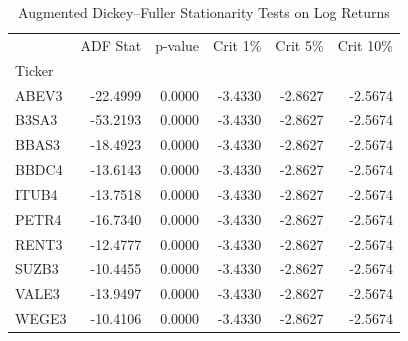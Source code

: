 \begin{table}
\caption{Augmented Dickey--Fuller Stationarity Tests on Log Returns}
\label{tab:stationarity}
\begin{tabular}{lrrrrr}
\toprule
 & ADF Stat & p-value & Crit 1\% & Crit 5\% & Crit 10\% \\
Ticker &  &  &  &  &  \\
\midrule
ABEV3 & -22.4999 & 0.0000 & -3.4330 & -2.8627 & -2.5674 \\
B3SA3 & -53.2193 & 0.0000 & -3.4330 & -2.8627 & -2.5674 \\
BBAS3 & -18.4923 & 0.0000 & -3.4330 & -2.8627 & -2.5674 \\
BBDC4 & -13.6143 & 0.0000 & -3.4330 & -2.8627 & -2.5674 \\
ITUB4 & -13.7518 & 0.0000 & -3.4330 & -2.8627 & -2.5674 \\
PETR4 & -16.7340 & 0.0000 & -3.4330 & -2.8627 & -2.5674 \\
RENT3 & -12.4777 & 0.0000 & -3.4330 & -2.8627 & -2.5674 \\
SUZB3 & -10.4455 & 0.0000 & -3.4330 & -2.8627 & -2.5674 \\
VALE3 & -13.9497 & 0.0000 & -3.4330 & -2.8627 & -2.5674 \\
WEGE3 & -10.4106 & 0.0000 & -3.4330 & -2.8627 & -2.5674 \\
\bottomrule
\end{tabular}
\end{table}
